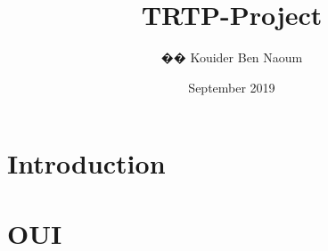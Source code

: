 \documentclass{article}
\title{TRTP-Project}
\author{�� Kouider Ben Naoum}
\date{September 2019}
\begin{document}
\maketitle

\section{Introduction}

\section{OUI}
\end{document}
